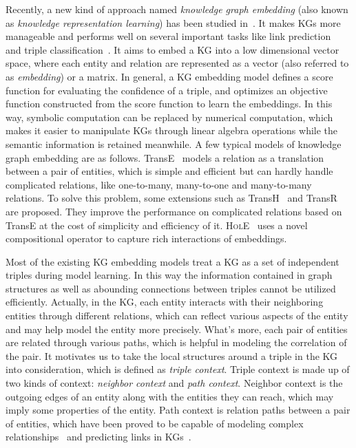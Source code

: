 Recently, a new kind of approach named \emph{knowledge graph embedding} (also known as \emph{knowledge representation learning}) has been studied in~\cite{NickelTK11}\cite{SocherCMN13}\cite{BordesUGWY13}\cite{WangZFC14}\cite{LinLSLZ15}. It makes KGs more manageable and performs well on several important tasks like link prediction~\cite{BordesWCB11} and triple classification~\cite{SocherCMN13}. It aims to embed a KG into a low dimensional vector space, where each entity and relation are represented as a vector (also referred to as \emph{embedding}) or a matrix. In general, a KG embedding model defines a score function for evaluating the confidence of a triple, and optimizes an objective function constructed from the score function to learn the embeddings. In this way, symbolic computation can be replaced by numerical computation, which makes it easier to manipulate KGs through linear algebra operations while the semantic information is retained meanwhile. A few typical models of knowledge graph embedding are as follows. TransE~\cite{BordesUGWY13} models a relation as a translation between a pair of entities, which is simple and efficient but can hardly handle complicated relations, like one-to-many, many-to-one and many-to-many relations. To solve this problem, some extensions such as TransH~\cite{WangZFC14} and TransR~\cite{LinLSLZ15} are proposed. They improve the performance on complicated relations based on TransE at the cost of simplicity and efficiency of it. \textsc{HolE}~\cite{NickelRP16} uses a novel compositional operator to capture rich interactions of embeddings.

Most of the existing KG embedding models treat a KG as a set of independent triples during model learning. In this way the information contained in graph structures as well as abounding connections between triples cannot be utilized efficiently. Actually, in the KG, each entity interacts with their neighboring entities through different relations, which can reflect various aspects of the entity and may help model the entity more precisely. What's more, each pair of entities are related through various paths, which is helpful in modeling the correlation of the pair. It motivates us to take the local structures around a triple in the KG into consideration, which is defined as \emph{triple context}. Triple context is made up of two kinds of context: \emph{neighbor context} and \emph{path context}. Neighbor context is the outgoing edges of an entity along with the entities they can reach, which may imply some properties of the entity. Path context is relation paths between a pair of entities, which have been proved to be capable of modeling complex relationships~\cite{LinLLSRL15} and predicting links in KGs~\cite{DBLP:conf/emnlp/LaoMC11}.

